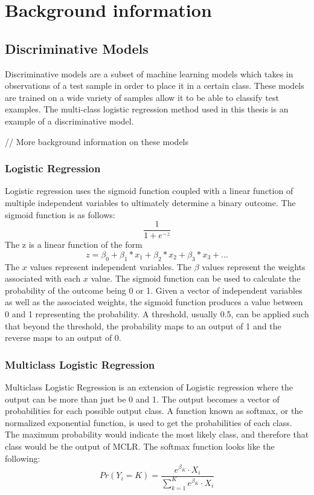 \documentclass[12pt]{article}
\begin{document}
\section{Background information}

\subsection{Discriminative Models}
Discriminative models are a subset of machine learning models which takes in observations of a test sample in order to place it in a certain class.
These models are trained on a wide variety of samples allow it to be able to classify test examples. The multi-class logistic regression method used in this thesis is an example of a discriminative model. 

// More background information on these models

\subsubsection{Logistic Regression}
Logistic regression uses the sigmoid function coupled with a linear function of multiple independent variables to ultimately determine a binary outcome. The sigmoid function is as follows: 
\[\frac{1}{1+e^{-z}}\]
The z is a linear function of the form
\[z = \beta_0 + \beta_1*x_1 + \beta_2*x_2 + \beta_3*x_3  + ...\]
The \(x\) values represent independent variables. The \(\beta\) values represent the weights associated with each \(x\) value. The sigmoid function can be used to calculate the probability of the outcome being 0 or 1. Given a vector of independent variables as well as the associated weights, the sigmoid function produces a value between 0 and 1 representing the probability. A threshold, usually 0.5, can be applied such that beyond the threshold, the probability maps to an output of 1 and the reverse maps to an output of 0. 

\subsubsection{Multiclass Logistic Regression}
Multiclass Logistic Regression is an extension of Logistic regression where the output can be more than just be 0 and 1. The output becomes a vector of probabilities for each possible output class. A function known as softmax, or the normalized exponential function, is used to get the probabilities of each class. The maximum probability would indicate the most likely class, and therefore that class would be the output of MCLR. The softmax function looks like the following: 
\[Pr(Y_i = K) = \frac{e^{\beta_K} \cdot X_i}{\sum_{k=1}^{K} e^{\beta_K} \cdot X_i}\]
\end{document}
